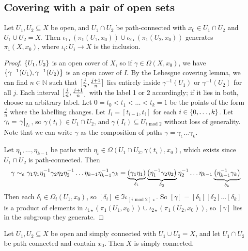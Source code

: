 \subsection{Covering with a pair of open sets}
\begin{theorem}
	Let \( U_1, U_2 \subseteq X \) be open, and \( U_1 \cap U_2 \) be path-connected with \( x_0 \in U_1 \cap U_2 \) and \( U_1 \cup U_2 = X \).
	Then \( \iota_{1\star}(\pi_1(U_1,x_0)) \cup \iota_{2\star}(\pi_1(U_2,x_0)) \) generates \( \pi_1(X,x_0) \), where \( \iota_i \colon U_i \to X \) is the inclusion.
\end{theorem}
\begin{proof}
	\( \qty{U_1, U_2} \) is an open cover of \( X \), so if \( \gamma \in \Omega(X,x_0) \), we have \( \qty{\gamma^{-1}(U_1), \gamma^{-1}(U_2)} \) is an open cover of \( I \).
	By the Lebesgue covering lemma, we can find \( n \in \mathbb N \) such that \( \qty[\frac{j}{n}, \frac{j+1}{n}] \) lies entirely inside \( \gamma^{-1}(U_1) \) or \( \gamma^{-1}(U_2) \) for all \( j \).
	Each interval \( \qty[\frac{j}{n}, \frac{j+1}{n}] \) with the label 1 or 2 accordingly; if it lies in both, choose an arbitrary label.
	Let \( 0 = t_0 < t_1 < \dots < t_k = 1 \) be the points of the form \( \frac{j}{n} \) where the labelling changes.
	Let \( I_i = [t_{i-1}, t_i] \) for each \( i \in \qty{0, \dots, k} \).
	Let \( \gamma_i = \eval{\gamma}_{I_i} \), so \( \gamma(t_i) \in U_1 \cap U_2 \), and \( \gamma(I_i) \subseteq U_{i \text{ mod } 2} \) without loss of generality.
	Note that we can write \( \gamma \) as the composition of paths \( \gamma = \gamma_1 \dots \gamma_k \).

	Let \( \eta_1, \dots, \eta_{k-1} \) be paths with \( \eta_i \in \Omega(U_1 \cap U_2, \gamma(t_i), x_0) \), which exists since \( U_1 \cap U_2 \) is path-connected.
	Then
	\[ \gamma \sim_e \gamma_1 \eta_1 \eta_1^{-1} \gamma_2 \eta_2 \eta_2^{-1} \dots \eta_{k-1} \eta_{k-1}^{-1} \gamma_k = \underbrace{\qty(\gamma_1 \eta_1)}_{\delta_1} \underbrace{\qty(\eta_1^{-1} \gamma_2 \eta_2)}_{\delta_2} \eta_2^{-1} \dots \eta_{k-1} \underbrace{\qty(\eta_{k-1}^{-1} \gamma_k)}_{\delta_k} \]
	Then each \( \delta_i \in \Omega_i(U_1, x_0) \), so \( [\delta_i] \in \Im \iota_{(i \text{ mod } 2)\star} \).
	So \( [\gamma] = [\delta_1][\delta_2]\dots[\delta_k] \) is a product of elements in \( \iota_{1\star}(\pi_1(U_1,x_0)) \cup \iota_{2\star}(\pi_1(U_2,x_0)) \), so \( [\gamma] \) lies in the subgroup they generate.
\end{proof}
\begin{corollary}
	Let \( U_1, U_2 \subseteq X \) be open and simply connected with \( U_1 \cup U_2 = X \), and let \( U_1 \cap U_2 \) be path connected and contain \( x_0 \).
	Then \( X \) is simply connected.
\end{corollary}
